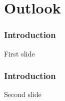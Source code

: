 \section{Outlook}

\begin{frame}
    \frametitle{Introduction}

    First slide

\end{frame}

\begin{frame}
    \frametitle{Introduction}

    Second slide

\end{frame}
